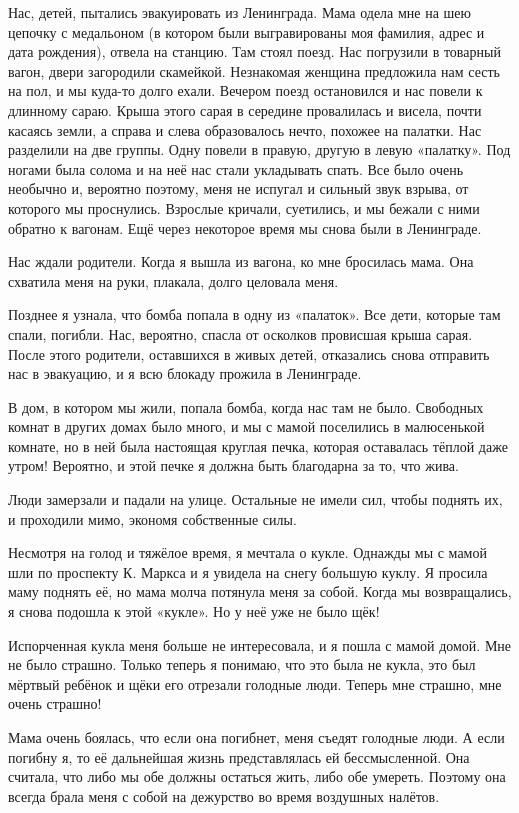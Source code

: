 Нас, детей, пытались эвакуировать из Ленинграда.
Мама одела мне на шею цепочку с медальоном (в котором были выгравированы моя фамилия, адрес и дата рождения), отвела на станцию.
Там стоял поезд.
Нас погрузили в товарный вагон, двери загородили скамейкой.
Незнакомая женщина предложила нам сесть на пол, и мы куда-то долго ехали.
Вечером поезд остановился и нас повели к длинному сараю.
Крыша этого сарая в середине провалилась и висела, почти касаясь земли, а справа и слева образовалось нечто, похожее на палатки.
Нас разделили на две группы.
Одну повели в правую, другую в левую «палатку».
Под ногами была солома и на неё нас стали укладывать спать.
Все было очень необычно и, вероятно поэтому, меня не испугал и сильный звук взрыва, от которого мы проснулись.
Взрослые кричали, суетились, и мы бежали с ними обратно к вагонам.
Ещё через некоторое время мы снова были в Ленинграде.

Нас ждали родители.
Когда я вышла из вагона, ко мне бросилась мама.
Она схватила меня на руки, плакала, долго целовала меня.

Позднее я узнала, что бомба попала в одну из «палаток».
Все дети, которые там спали, погибли.
Нас, вероятно, спасла от осколков провисшая крыша сарая.
После этого родители, оставшихся в живых детей, отказались снова отправить нас в эвакуацию, и я всю блокаду прожила в Ленинграде.

В дом, в котором мы жили, попала бомба, когда нас там не было.
Свободных комнат в других домах было много, и мы с мамой поселились в малюсенькой комнате, но в ней была настоящая круглая печка, которая оставалась тёплой даже утром!
Вероятно, и этой печке я должна быть благодарна за то, что жива.

Люди замерзали и падали на улице.
Остальные не имели сил, чтобы поднять их, и проходили мимо, экономя собственные силы.

Несмотря на голод и тяжёлое время, я мечтала о кукле.
Однажды мы с мамой шли по проспекту К. Маркса и я увидела на снегу большую куклу.
Я просила маму поднять её, но мама молча потянула меня за собой.
Когда мы возвращались, я снова подошла к этой «кукле».
Но у неё уже не было щёк!

Испорченная кукла меня больше не интересовала, и я пошла с мамой домой.
Мне не было страшно.
Только теперь я понимаю, что это была не кукла, это был мёртвый ребёнок и щёки его отрезали голодные люди.
Теперь мне страшно, мне очень страшно!

Мама очень боялась, что если она погибнет, меня съедят голодные люди.
А если погибну я, то её дальнейшая жизнь представлялась ей бессмысленной.
Она считала, что либо мы обе должны остаться жить, либо обе умереть.
Поэтому она всегда брала меня с собой на дежурство во время воздушных налётов.

